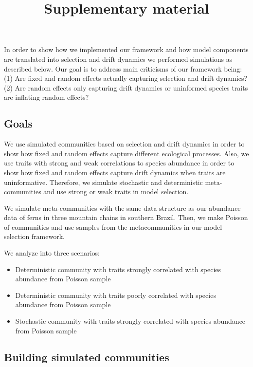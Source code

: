 \title{Supplementary material}
\author{}
\date{}


\maketitle

In order to show how we implemented our framework and how model
components are translated into selection and drift dynamics we performed
simulations as described below. Our goal is to address main criticisms
of our framework being: (1) Are fixed and random effects actually
capturing selection and drift dynamics? (2) Are random effects only
capturing drift dynamics or uninformed species traits are inflating
random effects?

\subsection*{Goals}\label{material-and-methods}

We use simulated communities based on selection and drift dynamics in
order to show how fixed and random effects capture different ecological
processes. Also, we use traits with strong and weak correlations to
species abundance in order to show how fixed and random effects capture
drift dynamics when traits are uninformative. Therefore, we simulate
stochastic and deterministic meta-communities and use strong or weak
traits in model selection.

We simulate meta-communities with the same data structure as our
abundance data of ferns in three mountain chains in southern Brazil.
Then, we make Poisson of communities and use samples from the
metacommunities in our model selection framework.

We analyze into three scenarios:

\begin{itemize}
\tightlist
\item
  Deterministic community with traits strongly correlated with species abundance from Poisson sample
\item
  Deterministic community with traits poorly correlated with species abundance from Poisson sample
\item
  Stochastic community with traits strongly correlated with species abundance from Poisson sample
\end{itemize}

\subsection*{Building simulated
communities}\label{building-simulated-communities}

